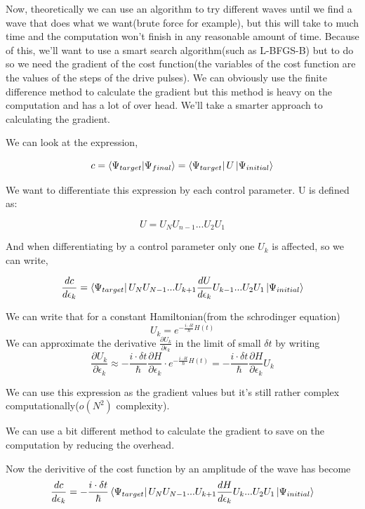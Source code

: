 \documentclass[english, a4paper, 12pt, twoside]{article}
\numberwithin{equation}{section} %
\begin{document}
Now, theoretically we can use an algorithm to try different waves until we find a wave that does what we want(brute force for example), but this will take to much time and the computation won't finish in any reasonable amount of time. Because of this, we'll want to use a smart search algorithm(such as L-BFGS-B) but to do so we need the gradient of the cost function(the variables of the cost function are the values of the steps of the drive pulses). We can obviously use the finite difference method to calculate the gradient but this method is heavy on the computation and has a lot of over head. We'll take a smarter approach to calculating the gradient.\par
We can look at the expression,  %

\begin{equation} \label{def:overlap}
c = \braket{\Psi_{target}}{\Psi_{final}} = \bra{\Psi_{target}}U\ket{\Psi_{initial}}
\end{equation}

We want to differentiate this expression by each control parameter. U is defined as:

$$U = U_N U_{n-1}...U_2 U_1$$

And when differentiating by a control parameter only one $U_k$ is affected, so we can write,

$$\frac{dc}{d\epsilon_k} = \bra{\Psi_{target}}U_N U_{N-1} ... U_{k+1}\frac{dU}{d\epsilon_k} U_{k-1} ...U_2 U_1\ket{\Psi_{initial}} $$

We can write that for a constant Hamiltonian(from the schrodinger equation)
$$U_k = e^{-\frac{i\cdot \delta t}{\hbar}H(t)}$$
We can approximate the derivative $\frac{\partial U_k}{\partial \epsilon_k}$ in the limit of small $\delta t$ by writing
\begin{equation*}
    \frac{\partial U_k}{\partial \epsilon_k} \approx -\frac{i\cdot \delta t}{\hbar}\frac{\partial H}{\partial \epsilon_k} \cdot e^{-\frac{i\cdot \delta t}{\hbar}H(t)} = -\frac{i\cdot \delta t}{\hbar}\frac{\partial H}{\partial \epsilon_k} U_k
\end{equation*}

We can use this expression as the gradient values but it's still rather complex computationally($o(N^2)$ complexity).\par
We can use a bit different method to calculate the gradient to save on the computation by reducing the overhead.

Now the derivitive of the cost function by an amplitude of the wave has become
\begin{equation} \label{eq:cost_init_deriv}
    \frac{dc}{d\epsilon_k} = -\frac{i\cdot \delta t}{\hbar} \bra{\Psi_{target}}U_N U_{N-1}... U_{k+1}\frac{dH}{d\epsilon_k} U_{k} ...U_2 U_1\ket{\Psi_{initial}} 
\end{equation}
\end{document}
